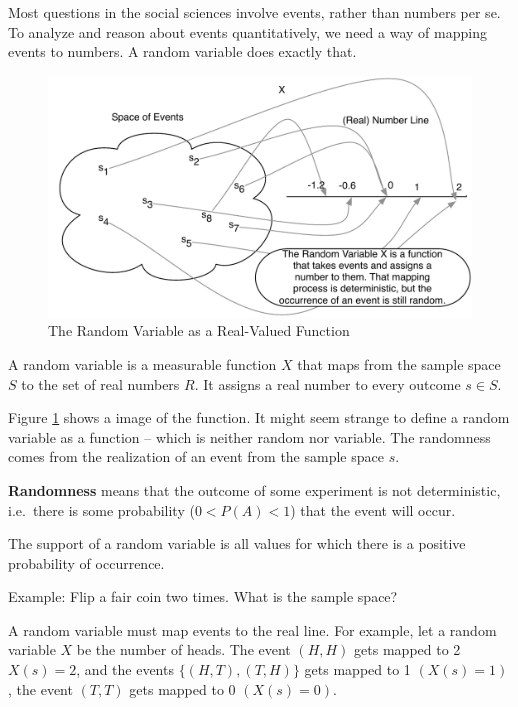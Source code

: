 \documentclass[]{book}
\theoremstyle{definition}
\theoremstyle{definition}
\theoremstyle{definition}
\theoremstyle{remark}
\let\BeginKnitrBlock\begin \let\EndKnitrBlock\end
\begin{document}
Most questions in the social sciences involve events, rather than numbers per se. To analyze and reason about events quantitatively, we need a way of mapping events to numbers. A random variable does exactly that.

\begin{figure}
\centering
\includegraphics{images/rv.pdf}
\caption{\label{fig:rv-image}The Random Variable as a Real-Valued Function}
\end{figure}

\BeginKnitrBlock{definition}[Random Variable]
\protect\hypertarget{def:unnamed-chunk-71}{}{\label{def:unnamed-chunk-71} {} }
A random variable is a measurable function \(X\) that maps from the sample space \(S\) to the set of real numbers \(R.\) It assigns a real number to every outcome \(s \in S\).
\EndKnitrBlock{definition}

Figure \ref{fig:rv-image} shows a image of the function. It might seem strange to define a random variable as a function -- which is neither random nor variable. The randomness comes from the realization of an event from the sample space \(s\).

\textbf{Randomness} means that the outcome of some experiment is not deterministic, i.e.~there is some probability (\(0 < P(A) < 1\)) that the event will occur.

The support of a random variable is all values for which there is a positive probability of occurrence.

Example: Flip a fair coin two times. What is the sample space?

A random variable must map events to the real line. For example, let a random variable \(X\) be the number of heads. The event \((H, H)\) gets mapped to 2 \(X(s) = 2\), and the events \(\{(H, T), (T, H)\}\) gets mapped to 1 \((X(s) = 1)\), the event \((T, T)\) gets mapped to 0 \((X(s) = 0)\).
\end{document}
